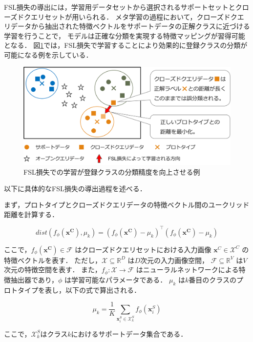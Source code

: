 FSL損失の導出には，学習用データセットから選択されるサポートセットとクローズドクエリセットが用いられる．
メタ学習の過程において，クローズドクエリデータから抽出された特徴ベクトルをサポートデータの正解クラスに近づける学習を行うことで，
モデルは正確な分類を実現する特徴マッピングが習得可能となる．
図\ref{fig:fsl_loss}では，FSL損失で学習することにより効果的に登録クラスの分類が可能になる例を示している．
% 
\begin{figure}[tbp]
  \centering
  \includegraphics[width=\linewidth, keepaspectratio]{image/fsl_loss.png}
  \caption{FSL損失での学習が登録クラスの分類精度を向上させる例}
  \label{fig:fsl_loss}
\end{figure}
% 
以下に具体的なFSL損失の導出過程を述べる．

まず，プロトタイプとクローズドクエリデータの特徴ベクトル間のユークリッド距離を計算する．

\begin{equation}
  dist(f_{\phi}(\bm{x^C}),\mu_{k})=(f_{\phi}(\bm{x^C}) - \mu_{k})^{\top} (f_{\phi}(\bm{x^C}) - \mu_{k})
\end{equation}

\noindent
ここで，$f_{\phi}(\bm{x^C}) \in \mathcal{F}$ はクローズドクエリセットにおける入力画像 $\bm{x}^C \in \mathcal{X}^C$ の特徴ベクトルを表す．
ただし，$\mathcal{X} \subseteq \mathbb{R}^D$ は$D$次元の入力画像空間， $\mathcal{F} \subseteq \mathbb{R}^V$ は$V$次元の特徴空間を表す．
また，$f_{\phi}: \mathcal{X} \rightarrow \mathcal{F}$ はニューラルネットワークによる特徴抽出器であり，$\phi$ は学習可能なパラメータである．
$\mu_{k}$ は$k$番目のクラスのプロトタイプを表し，以下の式で算出される．

\begin{equation}
  \mu_{k} = \frac{1}{K} \sum_{\bm{x}^S_i \in \mathcal{X}^S_k} {f_\phi(\bm{x}^S_i)}
\end{equation}

\noindent
ここで，$\mathcal{X}^S_k$はクラス$k$におけるサポートデータ集合である．

